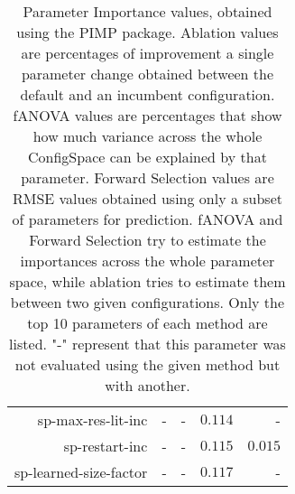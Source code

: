 \begin{table}
\begin{tabular}{r|r|r|r|r}
sp-max-res-lit-inc          &                 - &                 - & $          0.114$ &                 -\\
sp-restart-inc              &                 - &                 - & $          0.115$ & $          0.015$\\
sp-learned-size-factor      &                 - &                 - & $          0.117$ &                 -\\
\bottomrule
\end{tabular}
\caption{Parameter Importance values, obtained using the PIMP package. Ablation values are percentages of improvement a single parameter change obtained between the default and an incumbent configuration.
fANOVA values are percentages that show how much variance across the whole ConfigSpace can be explained by that parameter.
Forward Selection values are RMSE values obtained using only a subset of parameters for prediction.
fANOVA and Forward Selection try to estimate the importances across the whole parameter space, while ablation tries to estimate them between two given configurations.
Only the top 10 parameters of each method are listed.
                    "-" represent that this parameter was not evaluated
                     using the given method but with another.
                    }
\label{tab:pimp}
\end{table}
